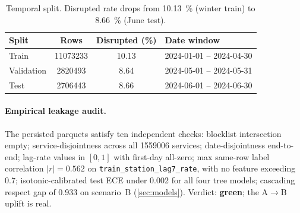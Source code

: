 \begin{table}[H]
    \centering
    \caption{Temporal split. Disrupted rate drops from \SI{10.13}{\percent} (winter train) to \SI{8.66}{\percent} (June test).}
    \label{tab:splits}
    \footnotesize
    \begin{tabular}{l
        S[table-format=8.0,group-separator={,}]
        S[table-format=2.2]
        l}
        \toprule
        Split & {Rows} & {Disrupted (\%)} & Date window \\
        \midrule
        Train      & 11073233 & 10.13 & 2024-01-01 -- 2024-04-30 \\
        Validation &  2820493 &  8.64 & 2024-05-01 -- 2024-05-31 \\
        Test       &  2706443 &  8.66 & 2024-06-01 -- 2024-06-30 \\
        \bottomrule
    \end{tabular}
\end{table}

\paragraph{Empirical leakage audit.} The persisted parquets satisfy ten independent checks: blocklist intersection empty; service-disjointness across all \num{1559006} services; date-disjointness end-to-end; lag-rate values in $[0,1]$ with first-day all-zero; max same-row label correlation $|r|=\num{0.562}$ on \texttt{train\_station\_lag7\_rate}, with no feature exceeding \num{0.7}; isotonic-calibrated test ECE under \num{0.002} for all four tree models; cascading respect gap of \num{0.933} on scenario~B (\cref{sec:models}). Verdict: \textbf{green}; the A$\to$B uplift is real.
